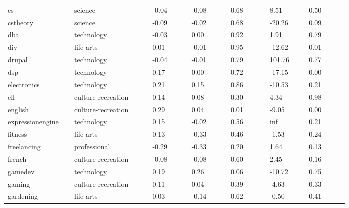 \begin{longtabu}{@{}
	p{0.17\linewidth}
	p{0.2\linewidth}
	P{0.1\linewidth}
	P{0.1\linewidth}
	P{0.1\linewidth}
	P{0.1\linewidth}
	p{0.1\linewidth}@{}}
cs               & science            & -0.04          & -0.08          & 0.68   & 8.51              & 0.50             \\
cstheory         & science            & -0.09          & -0.02          & 0.68   & -20.26            & 0.09             \\
dba              & technology         & -0.03          & 0.00           & 0.92   & 1.91              & 0.79             \\
diy              & life-arts          & 0.01           & -0.01          & 0.95   & -12.62            & 0.01             \\
drupal           & technology         & -0.04          & -0.01          & 0.79   & 101.76            & 0.77             \\
dsp              & technology         & 0.17           & 0.00           & 0.72   & -17.15            & 0.00             \\
electronics      & technology         & 0.21           & 0.15           & 0.86   & -10.53            & 0.21             \\
ell              & culture-recreation & 0.14           & 0.08           & 0.30   & 4.34              & 0.98             \\
english          & culture-recreation & 0.29           & 0.04           & 0.01   & -9.05             & 0.00             \\
expressionengine & technology         & 0.15           & -0.02          & 0.56   & inf               & 0.21             \\
fitness          & life-arts          & 0.13           & -0.33          & 0.46   & -1.53             & 0.24             \\
freelancing      & professional       & -0.29          & -0.33          & 0.20   & 1.64              & 0.13             \\
french           & culture-recreation & -0.08          & -0.08          & 0.60   & 2.45              & 0.16             \\
gamedev          & technology         & 0.19           & 0.26           & 0.06   & -10.72            & 0.75             \\
gaming           & culture-recreation & 0.11           & 0.04           & 0.39   & -4.63             & 0.33             \\
gardening        & life-arts          & 0.03           & -0.14          & 0.62   & -0.50             & 0.41             \\

\end{longtabu}

